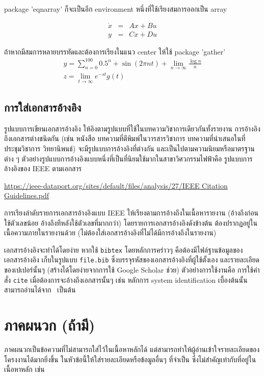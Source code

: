 \documentclass[11pt,a4paper]{article}
\begin{document}
package 'eqnarray' ก็จะเป็นอีก environment หนึ่งที่ใช้เรียงสมการออกเป็น array

\begin{eqnarray}
\dot{x} &=& Ax + Bu \\
y &=& Cx+Du
\end{eqnarray}

ถ้าหากมีสมการหลายบรรทัดและต้องการเรียงในแนว center ให้ใช้ package 'gather'
\begin{gather}
y = \sum_{n=0}^100 0.5^n + \sin(2\pi n t) + \lim_{n \rightarrow \infty} \frac{\log n}{n} \\
z = \lim_{t \rightarrow \infty} e^{-st} g(t) 
\end{gather}

\subsection{การใส่เอกสารอ้างอิง}
รูปแบบการเขียนเอกสารอ้างอิง ให้อิงตามรูปแบบที่ใช้ในบทความวิชาการเดียวกันทั้งรายงาน การอ้างอิงถึงเอกสารต่างชนิดกัน (เช่น หนังสือ บทความที่ตีพิมพ์ในวารสารวิชาการ บทความที่นำเสนอในที่ประชุมวิชาการ วิทยานิพนธ์) จะมีรูปแบบการอ้างอิงที่ต่างกัน และเป็นไปตามความนิยมหรือมาตรฐานต่าง ๆ ตัวอย่างรูปแบบการอ้างอิงแบบหนึ่งที่เป็นที่นิยมใช้มากในสาขาวิศวกรรมไฟฟ้าคือ รูปแบบการอ้างอิงของ IEEE ตามเอกสาร

\url{https://ieee-dataport.org/sites/default/files/analysis/27/IEEE Citation Guidelines.pdf}

การเรียงลำดับรายการเอกสารอ้างอิงแบบ IEEE ให้เรียงตามการอ้างถึงในเนื้อหารายงาน (อ้างถึงก่อนใช้ตัวเลขน้อย อ้างถึงทีหลังใช้ตัวเลขที่มากกว่า) โดยรายการเอกสารอ้างอิงดังข้างต้น ต้องปรากฏอยู่ในเนื้อความภายในรายงานด้วย (ไม่ต้องใส่เอกสารอ้างอิงที่ไม่ได้มีการอ้างถึงในรายงาน)


เอกสารอ้างอิงจะทำได้โดยง่าย หากใช้ \texttt{bibtex} โดยหลักการคร่าวๆ คือต้องมีไฟล์ฐานข้อมูลของเอกสารอ้างอิง เก็บในรูปแบบ \texttt{file.bib} ซึ่งบรรจุรหัสของเอกสารอ้างอิงที่ผู้ใช้ตั้งเอง และรายละเอียดของเปเปอร์นั้นๆ (สร้างได้โดยง่ายจากการใช้ Google Scholar ช่วย) ตัวอย่างการใช้งานคือ การใช้คำสั่ง \texttt{cite} เมื่อต้องการจะอ้างถึงเอกสารนั้นๆ เช่น หลักการ system identification เบื้องต้นนั้นสามารถอ่านได้จาก~\cite{SoS:89} เป็นต้น




\section{ภาคผนวก (ถ้ามี)}
ภาคผนวกเป็นข้อความที่ไม่สามารถใส่ไว้ในเนื้อหาหลักได้ แต่สามารถทำให้ผู้อ่านเข้าใจรายละเอียดของโครงงานได้มากยิ่งขึ้น ในหัวข้อนี้ให้ใส่รายละเอียดหรือข้อมูลอื่นๆ ที่จำเป็น ซึ่งไม่สำคัญเท่ากับที่อยู่ในเนื้อหาหลัก เช่น
\end{document}
